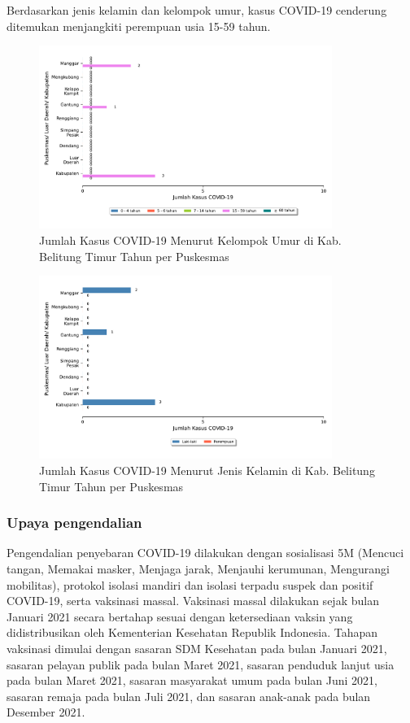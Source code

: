 Berdasarkan jenis kelamin dan kelompok umur, kasus COVID-19 cenderung ditemukan menjangkiti perempuan usia 15-59 tahun.

\begin{figure}[H]
	\centering
	\includegraphics[width=0.85\textwidth]{bab_06/bab_06_17d_kasusCovidPerUmur}
	\caption{Jumlah Kasus COVID-19 Menurut Kelompok Umur di Kab. Belitung Timur Tahun \tP per Puskesmas}
	\label{fig:COVID-per-umur}
\end{figure}

\begin{figure}[H]
	\centering
	\includegraphics[width=0.85\textwidth]{bab_06/bab_06_17e_kasusCovidPerJK}
	\caption{Jumlah Kasus COVID-19 Menurut Jenis Kelamin di Kab. Belitung Timur Tahun \tP per Puskesmas}
	\label{fig:COVID-per-JK}
\end{figure}

\subsubsection{Upaya pengendalian}
Pengendalian penyebaran COVID-19 dilakukan dengan sosialisasi 5M (Mencuci tangan, Memakai masker, Menjaga jarak, Menjauhi kerumunan, Mengurangi mobilitas), protokol isolasi mandiri dan isolasi terpadu suspek dan positif COVID-19, serta vaksinasi massal. Vaksinasi massal dilakukan sejak bulan Januari 2021 secara bertahap sesuai dengan ketersediaan vaksin yang didistribusikan oleh Kementerian Kesehatan Republik Indonesia. Tahapan vaksinasi dimulai dengan sasaran SDM Kesehatan pada bulan Januari 2021, sasaran pelayan publik pada bulan Maret 2021, sasaran penduduk lanjut usia pada bulan Maret 2021, sasaran masyarakat umum pada bulan Juni 2021, sasaran remaja pada bulan Juli 2021, dan sasaran anak-anak pada bulan Desember 2021.

